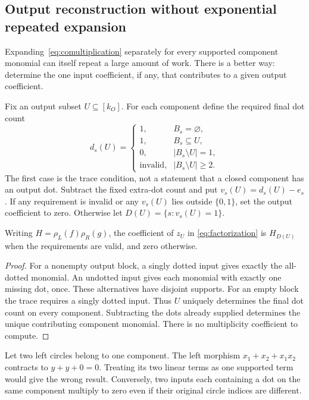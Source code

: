 \subsection{Output reconstruction without exponential repeated expansion}

Expanding~\eqref{eq:comultiplication} separately for every supported
component monomial can itself repeat a large amount of work. There is a
better way: determine the one input coefficient, if any, that contributes
to a given output coefficient.

Fix an output subset $U\subseteq[k_O]$. For each component define the
required final dot count
\[
 d_s(U)=
 \begin{cases}
 1,&B_s=\varnothing,\\
 1,&B_s\subseteq U,\\
 0,&|B_s\setminus U|=1,\\
 \text{invalid},&|B_s\setminus U|\geq2.
 \end{cases}
\]
The first case is the trace condition, not a statement that a closed
component has an output dot. Subtract the fixed extra-dot count and put
$v_s(U)=d_s(U)-e_s$. If any requirement is invalid or any $v_s(U)$ lies
outside $\{0,1\}$, set the output coefficient to zero. Otherwise let
$D(U)=\{s:v_s(U)=1\}$.

\begin{lemma}
\label{lem:output}
Writing $H=\rho_L(f)\rho_R(g)$, the coefficient of $z_U$ in
\eqref{eq:factorization} is $H_{D(U)}$ when the requirements are valid, and
zero otherwise.
\end{lemma}
\begin{proof}
For a nonempty output block, a singly dotted input gives exactly the
all-dotted monomial. An undotted input gives each monomial with exactly
one missing dot, once. These alternatives have disjoint supports. For an
empty block the trace requires a singly dotted input. Thus $U$ uniquely
determines the final dot count on every component. Subtracting the dots
already supplied determines the unique contributing component monomial.
There is no multiplicity coefficient to compute.
\end{proof}

\begin{example}
Let two left circles belong to one component. The left morphism
$x_1+x_2+x_1x_2$ contracts to $y+y+0=0$. Treating its two linear terms as
one supported term would give the wrong result. Conversely, two inputs
each containing a dot on the same component multiply to zero even if their
original circle indices are different.
\end{example}

